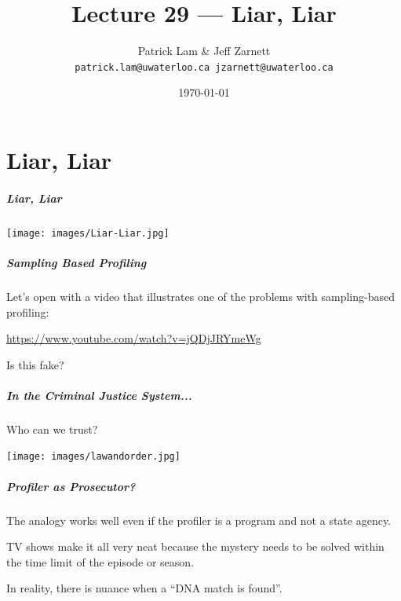 
\usepackage{soul}

\title{Lecture 29 --- Liar, Liar }

\author{Patrick Lam \& Jeff Zarnett \\ \small \texttt{patrick.lam@uwaterloo.ca jzarnett@uwaterloo.ca}}
\date{\today}




\begin{frame}
  \titlepage
 \end{frame}


\part{Liar, Liar}

\begin{frame}
\frametitle{Liar, Liar}

\begin{center}
	\texttt{[image: images/Liar-Liar.jpg]}
\end{center}


\end{frame}

\begin{frame}
\frametitle{Sampling Based Profiling}

Let's open with a video that illustrates one of the problems with sampling-based profiling:

\begin{center}
	\url{https://www.youtube.com/watch?v=jQDjJRYmeWg}
\end{center}

Is this fake?

\end{frame}


\begin{frame}
  \frametitle{In the Criminal Justice System...}
  
  
    Who can we trust?\\[1em]
    
    \begin{center}
	\texttt{[image: images/lawandorder.jpg]}
	\end{center}
\end{frame}

\begin{frame}
\frametitle{Profiler as Prosecutor?}
The analogy works well even if the profiler is a program and not a state agency.


TV shows make it all very neat because the mystery needs to be solved within the time limit of the episode or season.

In reality, there is nuance when a ``DNA match is found''.

\end{frame}

